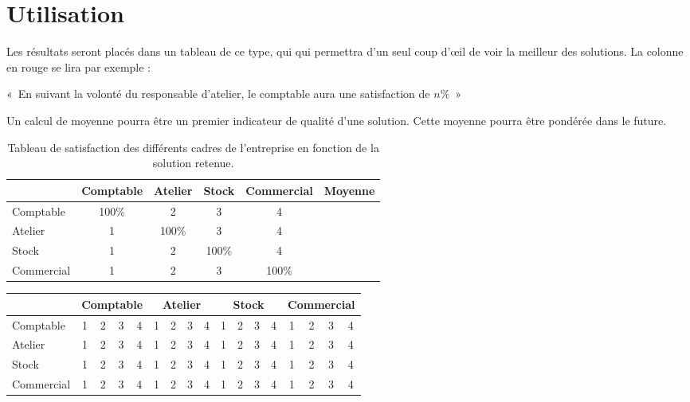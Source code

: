 \section{Utilisation}
Les résultats seront placés dans un tableau de ce type, qui qui permettra d'un
seul coup d'œil de voir la meilleur des solutions.
La colonne en rouge se lira par exemple : 
\begin{center}
«~En suivant la volonté du responsable d'atelier, le comptable aura une
satisfaction de $n\%$~»
\end{center}

Un calcul de moyenne pourra être un premier indicateur de qualité d'une
solution. Cette moyenne pourra être pondérée dans le future.

\begin{table}[h!]
    \begin{center}
    \begin{tabular}{|l|c|c|c|c|c|}
	\hline
	\cellcolor[gray]{0.9} & Comptable& Atelier & Stock & Commercial &
	Moyenne\\
	\hline
	Comptable & \cellcolor[gray]{0.9} 100\% & 2 & 3 & 4 & \\
	\hline
	Atelier & \cellcolor{red}1 & \cellcolor[gray]{0.9} 100\%  & 3 & 4 & \\
	\hline
	Stock & 1 & 2 & \cellcolor[gray]{0.9} 100\%  & 4 & \\
	\hline 
	Commercial & 1 & 2 & 3 & \cellcolor[gray]{0.9} 100\% & \\
	\hline
    \end{tabular}
    \end{center}
    \caption{Tableau de satisfaction des différents cadres de l'entreprise en
	fonction de la solution retenue.}
\end{table}



\begin{tabular}{|l||c|c|c|c||c|c|c|c||c|c|c|c||c|c|c|c|}
\hline
~ & \multicolumn{4}{|c||}{Comptable}
  & \multicolumn{4}{|c||}{Atelier}
  & \multicolumn{4}{|c||}{Stock}
  & \multicolumn{4}{|c|}{Commercial} \\
  \hline
Comptable & 1 & 2 & 3 & 4
	  & 1 & 2 & 3 & 4 
	  & 1 & 2 & 3 & 4
	  & 1 & 2 & 3 & 4 \\
\hline
Atelier & 1 & 2 & 3 & 4
	  & 1 & 2 & 3 & 4 
	  & 1 & 2 & 3 & 4
	  & 1 & 2 & 3 & 4 \\
\hline
Stock & 1 & 2 & 3 & 4
      & 1 & 2 & 3 & 4 
      & 1 & 2 & 3 & 4
      & 1 & 2 & 3 & 4 \\
\hline 
Commercial & 1 & 2 & 3 & 4
	   & 1 & 2 & 3 & 4 
	   & 1 & 2 & 3 & 4
	   & 1 & 2 & 3 & 4 \\
\hline


\end{tabular}


